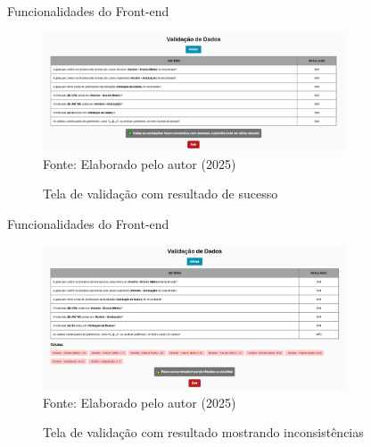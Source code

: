 \begin{frame}{Funcionalidades do Front-end}
    \begin{figure}
        \centering
        \vspace{-0.5cm}
        \caption{Tela de validação com resultado de sucesso}
        \vspace{-0.2cm}
        \includegraphics[width=0.8\textwidth]{figuras/front-22.png}
        \\ %
        \small Fonte: Elaborado pelo autor (2025)
    \end{figure}
\end{frame}

\begin{frame}{Funcionalidades do Front-end}
    \begin{figure}
        \centering
        \vspace{-0.5cm}
        \caption{Tela de validação com resultado mostrando inconsistências}
        \vspace{-0.2cm}
        \includegraphics[width=0.8\textwidth]{figuras/front-23.png}
        \\ %
        \small Fonte: Elaborado pelo autor (2025)
    \end{figure}
\end{frame}

